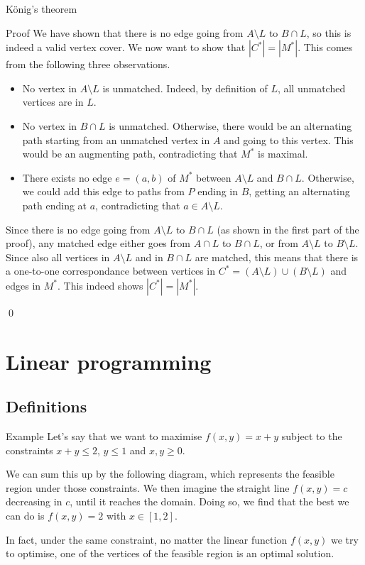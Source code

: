 \documentclass[a4paper]{article}
\begin{document}
\begin{parag}{König's theorem}
\begin{subparag}{Proof}
        We have shown that there is no edge going from $A \setminus L$ to $B \cap L$, so this is indeed a valid vertex cover. We now want to show that $\left|C^*\right| = \left|M^*\right|$. This comes from the following three observations.
        \begin{itemize}[left=0pt]
            \item No vertex in $A \setminus L$ is unmatched. Indeed, by definition of $L$, all unmatched vertices are in $L$.
            \item No vertex in $B \cap L$ is unmatched. Otherwise, there would be an alternating path starting from an unmatched vertex in $A$ and going to this vertex. This would be an augmenting path, contradicting that $M^*$ is maximal.
            \item There exists no edge $e = \left(a, b\right)$ of $M^*$ between $A \setminus L$ and $B \cap L$. Otherwise, we could add this edge to paths from $P$ ending in $B$, getting an alternating path ending at $a$, contradicting that $a \in A \setminus L$.
        \end{itemize}

        Since there is no edge going from $A \setminus L$ to $B \cap L$ (as shown in the first part of the proof), any matched edge either goes from $A \cap L$ to $B \cap L$, or from $A \setminus L$ to $B \setminus L$. Since also all vertices in $A \setminus L$ and in $B \cap L$ are matched, this means that there is a one-to-one correspondance between vertices in $C^* = \left(A \setminus L\right) \cup \left(B \setminus L\right)$ and edges in $M^*$. This indeed shows $\left|C^*\right| = \left|M^*\right|$.

        \qed
    \end{subparag}
\end{parag}


\section{Linear programming}

\subsection{Definitions}

\begin{parag}{Example}
    Let's say that we want to maximise $f\left(x, y\right) = x + y$ subject to the constraints $x + y \leq 2$, $y \leq 1$ and $x, y \geq 0$.

    We can sum this up by the following diagram, which represents the feasible region under those constraints. We then imagine the straight line $f\left(x, y\right) = c$ decreasing in $c$, until it reaches the domain. Doing so, we find that the best we can do is $f\left(x, y\right) = 2$ with $x \in \left[1, 2\right]$.

    In fact, under the same constraint, no matter the linear function $f\left(x, y\right)$ we try to optimise, one of the vertices of the feasible region is an optimal solution.
\end{parag}
\end{document}
